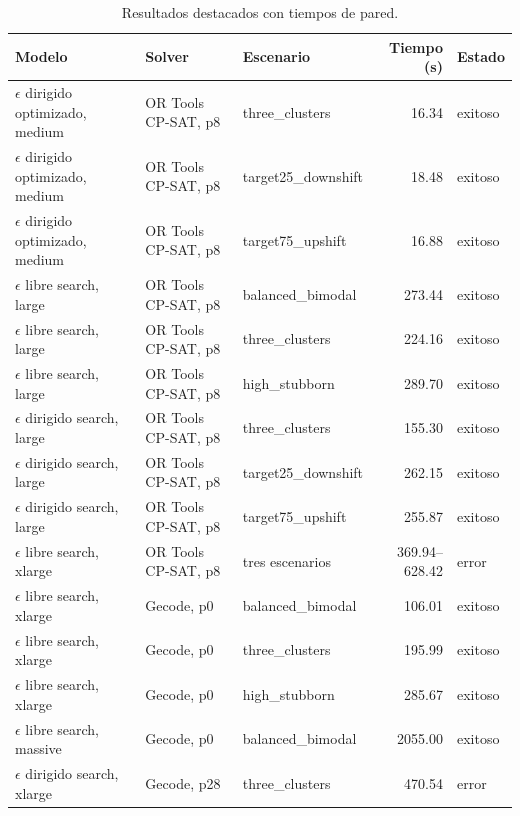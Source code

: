 \documentclass[10pt,letterpaper]{article}
\begin{document}
\begin{table}[H]
\centering
\caption{Resultados destacados con tiempos de pared.}
\begin{tabularx}{\linewidth}{l l l r l}
\toprule
\textbf{Modelo} & \textbf{Solver} & \textbf{Escenario} & \textbf{Tiempo (s)} & \textbf{Estado} \\
\midrule
\(\epsilon\) dirigido optimizado, medium & OR Tools CP-SAT, p8 & three\_clusters & 16.34 & exitoso \\
\(\epsilon\) dirigido optimizado, medium & OR Tools CP-SAT, p8 & target25\_downshift & 18.48 & exitoso \\
\(\epsilon\) dirigido optimizado, medium & OR Tools CP-SAT, p8 & target75\_upshift & 16.88 & exitoso \\
\(\epsilon\) libre search, large & OR Tools CP-SAT, p8 & balanced\_bimodal & 273.44 & exitoso \\
\(\epsilon\) libre search, large & OR Tools CP-SAT, p8 & three\_clusters & 224.16 & exitoso \\
\(\epsilon\) libre search, large & OR Tools CP-SAT, p8 & high\_stubborn & 289.70 & exitoso \\
\(\epsilon\) dirigido search, large & OR Tools CP-SAT, p8 & three\_clusters & 155.30 & exitoso \\
\(\epsilon\) dirigido search, large & OR Tools CP-SAT, p8 & target25\_downshift & 262.15 & exitoso \\
\(\epsilon\) dirigido search, large & OR Tools CP-SAT, p8 & target75\_upshift & 255.87 & exitoso \\
\(\epsilon\) libre search, xlarge & OR Tools CP-SAT, p8 & tres escenarios & 369.94--628.42 & error \\
\(\epsilon\) libre search, xlarge & Gecode, p0 & balanced\_bimodal & 106.01 & exitoso \\
\(\epsilon\) libre search, xlarge & Gecode, p0 & three\_clusters & 195.99 & exitoso \\
\(\epsilon\) libre search, xlarge & Gecode, p0 & high\_stubborn & 285.67 & exitoso \\
\(\epsilon\) libre search, massive & Gecode, p0 & balanced\_bimodal & 2055.00 & exitoso \\
\(\epsilon\) dirigido search, xlarge & Gecode, p28 & three\_clusters & 470.54 & error \\
\bottomrule
\end{tabularx}
\end{table}
\end{document}
